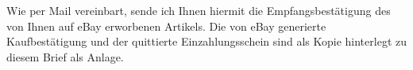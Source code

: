 \documentclass[11pt]{g-brief}
\begin{document}
\begin{g-brief}
Wie per Mail vereinbart, sende ich Ihnen hiermit die
Empfangsbestätigung des von Ihnen auf eBay erworbenen
Artikels. Die von eBay generierte Kaufbestätigung und der
quittierte Einzahlungsschein sind als Kopie hinterlegt zu
diesem Brief als Anlage.
\end{g-brief}
\end{document}
